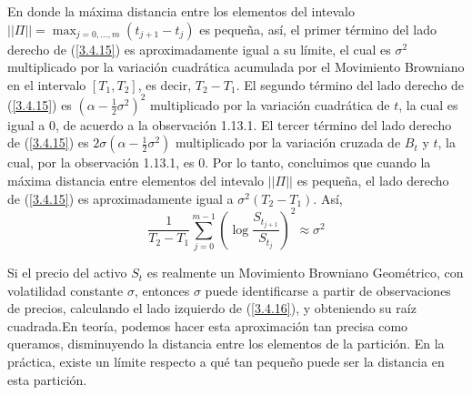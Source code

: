 \documentclass[11pt,notitlepage]{article}
\begin{document}
En donde la máxima distancia entre los elementos del intevalo  \(||\Pi||=\max_{j=0,...,m}(t_{j+1}-t_j)\) es pequeña, así, el primer término del lado derecho de (\ref{3.4.15}) es aproximadamente igual a su límite, el cual es \(\sigma^2\) multiplicado por la variación cuadrática acumulada por el Movimiento Browniano en el intervalo \([T_1,T_2]\), es decir, \(T_2-T_1\). El segundo término del lado derecho de (\ref{3.4.15}) es \(\left(\alpha - \frac{1}{2}\sigma^2\right)^2\) multiplicado por la variación cuadrática de \(t\), la cual es igual a \(0\), de acuerdo a la observación 1.13.1. El tercer término del lado derecho de (\ref{3.4.15}) es \(2\sigma \left(\alpha - \frac{1}{2}\sigma^2\right)\) multiplicado por la variación cruzada de \(B_t\) y \(t\), la cual, por la observación 1.13.1, es \(0\). Por lo tanto, concluimos que cuando la máxima distancia entre elementos del intevalo \(||\Pi||\) es pequeña, el lado derecho de (\ref{3.4.15}) es aproximadamente igual a \(\sigma^2(T_2-T_1)\). Así,
\begin{equation}\label{3.4.16}
    \frac{1}{T_2-T_1}\sum_{j=0}^{m-1}\left(\log\frac{S_{t_{j+1}}}{S_{t_j}}\right)^2 \approx \sigma^2
\end{equation}

Si el precio del activo \(S_{t}\) es realmente un Movimiento Browniano Geométrico, con volatilidad constante \(\sigma\), entonces \(\sigma\) puede identificarse a partir de observaciones de precios, calculando el
lado izquierdo de (\ref{3.4.16}), y obteniendo su raíz cuadrada.En teoría, podemos hacer esta aproximación tan precisa como queramos, disminuyendo la distancia entre los elementos de la partición. En la práctica, existe un límite respecto a qué tan pequeño puede ser la distancia en esta partición.
\end{document}
